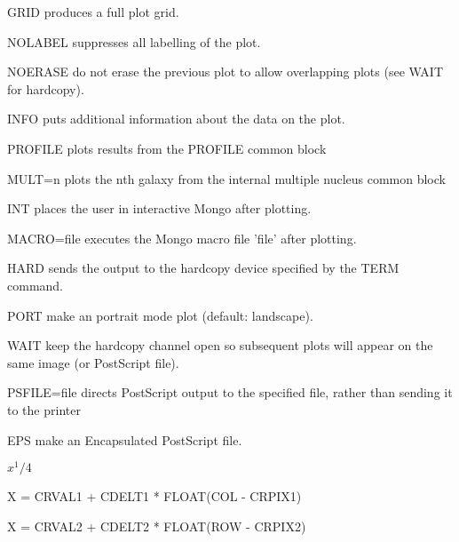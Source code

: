 {\begin{command}
  \item[GRID]{produces a full plot grid.}
  \item[NOLABEL]{suppresses all labelling of the plot.}
  \item[NOERASE]{do not erase the previous plot to allow overlapping
       plots (see WAIT for hardcopy).}
  \item[INFO]{puts additional information about the data on the plot.}
  \item[PROFILE ]{plots results from the PROFILE common block}
  \item[MULT=n ]{plots the nth galaxy from the internal multiple
        nucleus common block}
  \item[INT]{places the user in interactive Mongo after plotting.}
  \item[MACRO=file ]{executes the Mongo macro file 'file' after plotting.}
  \item[HARD]{sends the output to the hardcopy device specified by
       the TERM command.}
  \item[PORT]{make an portrait mode plot (default: landscape).}
  \item[WAIT]{keep the hardcopy channel open so subsequent plots will
              appear on the same image (or PostScript file).}
  \item[PSFILE=file]{directs PostScript output to the specified file,
       rather than sending it to the printer}
  \item[EPS]{make an Encapsulated PostScript file.}
\end{command}%
\lthtmlfigureZ
\lthtmlcheckvsize\clearpage}

{\newpage\clearpage
{}%
$x^1/4$%
\lthtmlinlinemathZ
\lthtmlcheckvsize\clearpage}

{\newpage\clearpage
{}%
\begin{hanging}
  \item{X = CRVAL1 + CDELT1 * FLOAT(COL - CRPIX1)}
\end{hanging}%
\lthtmlfigureZ
\lthtmlcheckvsize\clearpage}

{\newpage\clearpage
{}%
\begin{hanging}
  \item{X = CRVAL2 + CDELT2 * FLOAT(ROW - CRPIX2)}
\end{hanging}%
\lthtmlfigureZ
\lthtmlcheckvsize\clearpage}


